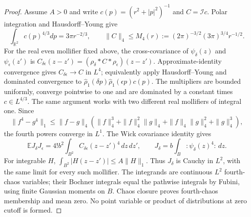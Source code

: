 \documentclass[11pt]{article}
\theoremstyle{plain}
\theoremstyle{definition}
\theoremstyle{remark}
\newcommand{\R}{\mathbb{R}}
\newcommand{\E}{\mathbb{E}}
\newcommand{\cI}{\mathcal{I}}
\begin{document}
\begin{proof}
Assume $A>0$ and write $c(p)=(r^2+|p|^2)^{-1}$ and $C=\cI c$.
Polar integration and Hausdorff--Young give
\begin{equation}\label{eq:classical-L4}
 \int_{\R^2}c(p)^{4/3}dp=3\pi r^{-2/3},\qquad
 \|C\|_4\le M_4(r):=(2\pi)^{-3/2}(3\pi)^{3/4}r^{-1/2}.
\end{equation}
For the real even mollifier fixed above, the cross-covariance of
$\psi_\delta(z)$ and $\psi_\epsilon(z')$ is
$C_{\delta\epsilon}(z-z')=(\rho_\delta*C*\rho_\epsilon)(z-z')$.
Approximate-identity convergence gives $C_{\delta\epsilon}\to C$ in $L^4$;
equivalently apply Hausdorff--Young and dominated convergence to
$\hat\rho_1(\delta p)\hat\rho_1(\epsilon p)c(p)$.
The multipliers are bounded uniformly, converge pointwise to one and are
dominated by a constant times $c\in L^{4/3}$. The same argument works with
two different real mollifiers of integral one. Since
\[
 \|f^4-g^4\|_1\le\|f-g\|_4
 (\|f\|_4^3+\|f\|_4^2\|g\|_4+\|f\|_4\|g\|_4^2+\|g\|_4^3),
\]
the fourth powers converge in $L^1$. The Wick covariance identity gives
\begin{equation}\label{eq:classical-chaos}
 \E J_\delta J_\epsilon
 =4!b^2\int_{B^2}C_{\delta\epsilon}(z-z')^4\,dz\,dz',
 \qquad J_\delta=b\int_B{:}\psi_\delta(z)^4{:}\,dz.
\end{equation}
For integrable $H$, $\int_{B^2}|H(z-z')|\le A\|H\|_1$.
Thus $J_\delta$ is Cauchy in $L^2$, with the same limit for every such
mollifier. The integrands are continuous $L^2$ fourth-chaos variables;
their Bochner integrals equal the pathwise integrals by Fubini, using finite
Gaussian moments on $B$. Chaos closure proves fourth-chaos membership and
mean zero. No point variable or product of distributions at zero cutoff is
formed.


\end{proof}
\end{document}
